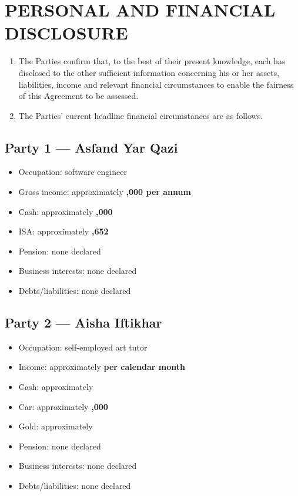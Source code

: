 \documentclass[10pt,a4paper]{article}
\newcommand{\PartyOne}{Asfand Yar Qazi}
\newcommand{\PartyTwo}{Aisha Iftikhar}
\begin{document}
\section*{PERSONAL AND FINANCIAL DISCLOSURE}

\begin{enumerate}[label=\arabic*., start=11, leftmargin=1.8em]
    \item The Parties confirm that, to the best of their present knowledge, each has disclosed to the other sufficient information concerning his or her assets, liabilities, income and relevant financial circumstances to enable the fairness of this Agreement to be assessed.
    \item The Parties' current headline financial circumstances are as follows.
\end{enumerate}

\subsection*{Party 1 --- \PartyOne}

\begin{itemize}[leftmargin=1.8em]
    \item Occupation: software engineer
    \item Gross income: approximately \textbf{,000 per annum}
    \item Cash: approximately \textbf{,000}
    \item ISA: approximately \textbf{,652}
    \item Pension: none declared
    \item Business interests: none declared
    \item Debts/liabilities: none declared
\end{itemize}

\subsection*{Party 2 --- \PartyTwo}

\begin{itemize}[leftmargin=1.8em]
    \item Occupation: self-employed art tutor
    \item Income: approximately \textbf{ per calendar month}
    \item Cash: approximately \textbf{}
    \item Car: approximately \textbf{,000}
    \item Gold: approximately \textbf{}
    \item Pension: none declared
    \item Business interests: none declared
    \item Debts/liabilities: none declared
\end{itemize}
\end{document}
